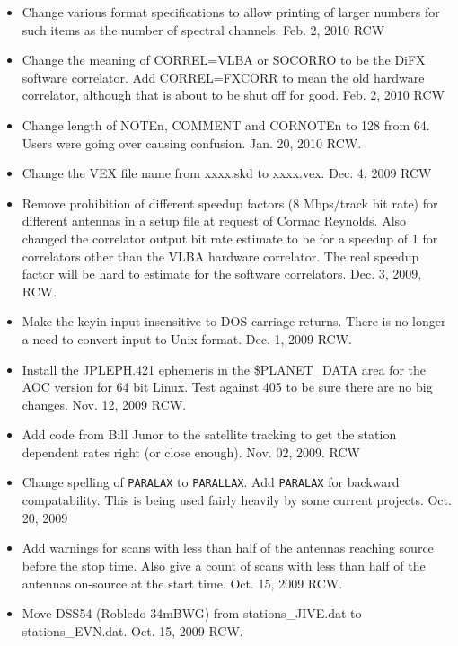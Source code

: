 \documentclass{report}
\begin{document}
\begin{itemize}
\item Change various format specifications to allow printing of
larger numbers for such items as the number of spectral channels.
Feb. 2, 2010  RCW

\item Change the meaning of CORREL=VLBA or SOCORRO to be the DiFX software
correlator.  Add CORREL=FXCORR to mean the old hardware correlator, although
that is about to be shut off for good.  Feb. 2, 2010  RCW

\item Change length of NOTEn, COMMENT and CORNOTEn to 128 from 64.  Users
were going over causing confusion.  Jan. 20, 2010  RCW.

\item Change the VEX file name from xxxx.skd to xxxx.vex.  Dec. 4, 2009 RCW

\item Remove prohibition of different speedup factors (8 Mbps/track bit rate)
for different antennas in a setup file at request of Cormac Reynolds.  Also
changed the correlator output bit rate estimate to be for a speedup of 1
for correlators other than the VLBA hardware correlator.  The real speedup
factor will be hard to estimate for the software correlators.  Dec. 3, 2009, RCW.

\item Make the keyin input insensitive to DOS carriage returns.  There
is no longer a need to convert input to Unix format.  Dec. 1, 2009 RCW.

\item Install the JPLEPH.421 ephemeris in the \$PLANET\_DATA area for
the AOC version for 64 bit Linux.  Test against 405 to be sure there
are no big changes.  Nov. 12, 2009 RCW.

\item Add code from Bill Junor to the satellite tracking to get the
station dependent rates right (or close enough).  Nov. 02, 2009.  RCW

\item Change spelling of {\tt PARALAX} to {\tt PARALLAX}.  Add {\tt PARALAX}
for backward compatability.  This is being used fairly heavily by some
current projects.  Oct. 20, 2009

\item Add warnings for scans with less than half of the antennas reaching
source before the stop time.  Also give a count of scans with less than
half of the antennas on-source at the start time.  Oct. 15, 2009  RCW.

\item Move DSS54 (Robledo 34mBWG) from stations\_JIVE.dat to stations\_EVN.dat.
Oct. 15, 2009  RCW.

\end{itemize}
\end{document}
